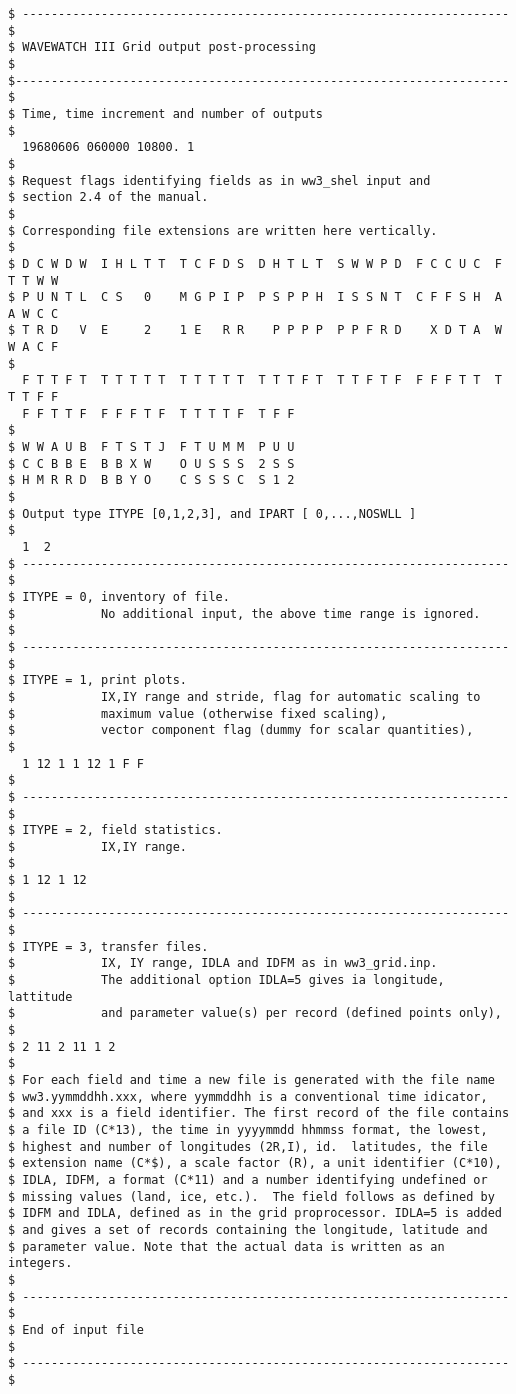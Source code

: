 \begin{verbatim}
$ -------------------------------------------------------------------- $
$ WAVEWATCH III Grid output post-processing                            $
$--------------------------------------------------------------------- $
$ Time, time increment and number of outputs
$
  19680606 060000 10800. 1
$
$ Request flags identifying fields as in ww3_shel input and
$ section 2.4 of the manual. 
$
$ Corresponding file extensions are written here vertically.  
$
$ D C W D W  I H L T T  T C F D S  D H T L T  S W W P D  F C C U C  F T T W W  
$ P U N T L  C S   0    M G P I P  P S P P H  I S S N T  C F F S H  A A W C C  
$ T R D   V  E     2    1 E   R R    P P P P  P P F R D    X D T A  W W A C F 
$
  F T T F T  T T T T T  T T T T T  T T T F T  T T F T F  F F F T T  T T T F F  
  F F T T F  F F F T F  T T T T F  T F F 
$
$ W W A U B  F T S T J  F T U M M  P U U
$ C C B B E  B B X W    O U S S S  2 S S
$ H M R R D  B B Y O    C S S S C  S 1 2
$
$ Output type ITYPE [0,1,2,3], and IPART [ 0,...,NOSWLL ]
$
  1  2
$ -------------------------------------------------------------------- $
$ ITYPE = 0, inventory of file.
$            No additional input, the above time range is ignored.
$
$ -------------------------------------------------------------------- $
$ ITYPE = 1, print plots.
$            IX,IY range and stride, flag for automatic scaling to
$            maximum value (otherwise fixed scaling),
$            vector component flag (dummy for scalar quantities),
$
  1 12 1 1 12 1 F F
$
$ -------------------------------------------------------------------- $
$ ITYPE = 2, field statistics.
$            IX,IY range.
$
$ 1 12 1 12
$
$ -------------------------------------------------------------------- $
$ ITYPE = 3, transfer files.
$            IX, IY range, IDLA and IDFM as in ww3_grid.inp.
$            The additional option IDLA=5 gives ia longitude, lattitude 
$            and parameter value(s) per record (defined points only),
$
$ 2 11 2 11 1 2
$
$ For each field and time a new file is generated with the file name
$ ww3.yymmddhh.xxx, where yymmddhh is a conventional time idicator,
$ and xxx is a field identifier. The first record of the file contains
$ a file ID (C*13), the time in yyyymmdd hhmmss format, the lowest,
$ highest and number of longitudes (2R,I), id.  latitudes, the file
$ extension name (C*$), a scale factor (R), a unit identifier (C*10),
$ IDLA, IDFM, a format (C*11) and a number identifying undefined or
$ missing values (land, ice, etc.).  The field follows as defined by
$ IDFM and IDLA, defined as in the grid proprocessor. IDLA=5 is added
$ and gives a set of records containing the longitude, latitude and
$ parameter value. Note that the actual data is written as an integers.
$
$ -------------------------------------------------------------------- $
$ End of input file                                                    $
$ -------------------------------------------------------------------- $
\end{verbatim}
